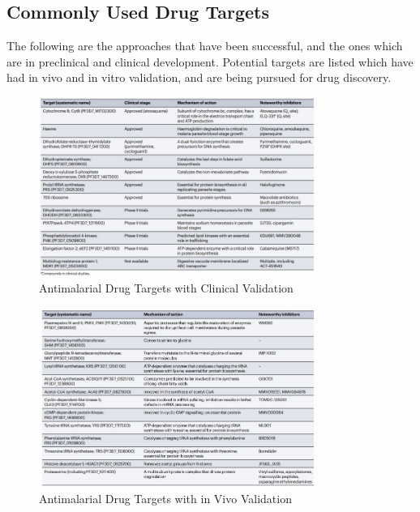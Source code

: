\documentclass[twoside]{article}
\begin{document}
\subsection*{Commonly Used Drug Targets}

The following are the approaches that have
been successful, and the ones which are in preclinical and clinical development. Potential targets are listed which have had in vivo and 
in vitro validation, and are being pursued for drug discovery.

\begin{figure}[H]
    \centering
    \includegraphics[width=0.8\textwidth]{drugtargets1.jpg}
    \caption{Antimalarial Drug Targets with Clinical Validation} 
    \label{fig: Antimalarial Drug Targets with Clinical Validation}
\end{figure}

\begin{figure}[H]
    \centering
    \includegraphics[width=0.8\textwidth]{drugtargets2.jpg}
    \caption{Antimalarial Drug Targets with in Vivo Validation}
    \label{fig: Antimalarial Drug Targets with in Vivo Validation}
\end{figure}
\end{document}
